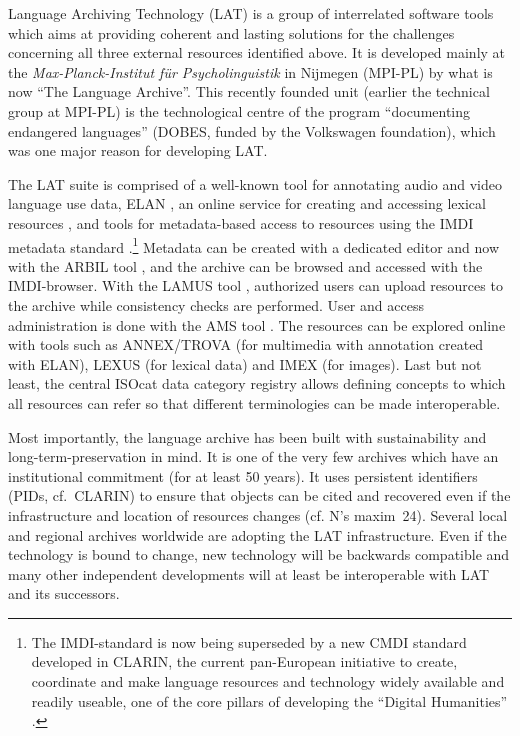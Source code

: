 Language Archiving Technology (LAT) is a group of interrelated software tools which aims at providing coherent and lasting solutions for the challenges concerning all three external resources identified above. It is developed mainly at the \textit{Max-Planck-Institut f\"ur Psycholinguistik} in Nijmegen (MPI-PL) by what is now ``The Language Archive''. This recently founded unit (earlier the technical group at MPI-PL) is the technological centre of the program ``documenting endangered languages'' (DOBES, funded by the Volkswagen foundation), which was one major reason for developing LAT.

The LAT  suite is comprised of a well-known tool for annotating audio and video language use data, ELAN \citep{WittenburgEtAl2006}, an online service for creating and accessing lexical resources \citep[cf.~LEXUS][]{RingersmaEtAl2007}, and tools for metadata-based access to resources using the IMDI metadata standard \citep{IMDITeam2003}.\footnote{The 
 IMDI-standard is now being superseded by a new CMDI standard developed in CLARIN, the current pan-European initiative to create, coordinate and make language resources and technology widely available and readily useable, one of the core pillars of developing the ``Digital Humanities'' \citet{SchreibmanEtAl2008}.
} 
Metadata can be created with a dedicated editor and now with the ARBIL tool \citep{Withers2009}, and the archive can be browsed and accessed with the IMDI-browser. With the LAMUS tool \citep{Broeder2011}, authorized users can upload resources to the archive while consistency checks are performed. User and access administration is done with the AMS tool \citep{AMS-II}. The resources can be explored online with tools such as ANNEX/TROVA (for multimedia with annotation created with ELAN), LEXUS (for lexical data) and IMEX (for images). Last but not least, the central ISOcat data category registry \citep{Kemps-SnijdersEtAl2009} allows defining concepts to which all resources can refer so that different terminologies can be made interoperable.

Most importantly, the language archive has been built with sustainability and long-term-preservation in mind. It is one of the very few archives which have an institutional commitment (for at least 50 years). It uses persistent identifiers (PIDs, cf.~CLARIN) to ensure that objects can be cited and recovered even if the infrastructure and location of resources changes (cf. N's maxim~24). Several local and regional archives worldwide are adopting the LAT infrastructure. Even if the technology is bound to change, new technology will be backwards compatible and many other independent developments will at least be interoperable with LAT and its successors. 


